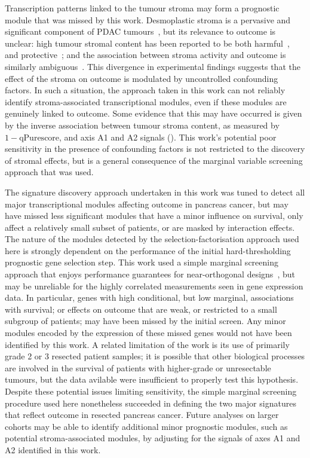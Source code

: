 \documentclass[dissertation.tex]{subfiles}
\begin{document}
Transcription patterns linked to the tumour stroma may form a prognostic module that was missed by this work.  Desmoplastic stroma is a pervasive and significant component of \gls{PDAC} tumours~\cite{Hidalgo2010}, but its relevance to outcome is unclear: high tumour stromal content has been reported to be both harmful~\cite{Luo2012, Provenzano2012}, and protective~\cite{Rhim2014, Sinn2014}; and the association between stroma activity and outcome is similarly ambiguous~\cite{Bever2014, Sinn2014}.  This divergence in experimental findings suggests that the effect of the stroma on outcome is modulated by uncontrolled confounding factors.  In such a situation, the approach taken in this work can not reliably identify stroma-associated transcriptional modules, even if these modules are genuinely linked to outcome.  Some evidence that this may have occurred is given by the inverse association between tumour stroma content, as measured by $1 - \mathrm{qPure score}$, and axis A1 and A2 signals ().  This work's potential poor sensitivity in the presence of confounding factors is not restricted to the discovery of stromal effects, but is a general consequence of the marginal variable screening approach that was used.

The signature discovery approach undertaken in this work was tuned to detect all major transcriptional modules affecting outcome in pancreas cancer, but may have missed less significant modules that have a minor influence on survival, only affect a relatively small subset of patients, or are masked by interaction effects.  The nature of the modules detected by the selection-factorisation approach used here is strongly dependent on the performance of the initial hard-thresholding prognostic gene selection step.  This work used a simple marginal screening approach that enjoys performance guarantees for near-orthogonal designs~\cite{Fan2008}, but may be unreliable for the highly correlated measurements seen in gene expression data.  In particular, genes with high conditional, but low marginal, associations with survival; or effects on outcome that are weak, or restricted to a small subgroup of patients; may have been missed by the initial screen.  Any minor modules encoded by the expression of these missed genes would not have been identified by this work.  A related limitation of the work is its use of primarily grade 2 or 3 resected patient samples; it is possible that other biological processes are involved in the survival of patients with higher-grade or unresectable tumours, but the data avilable were insufficient to properly test this hypothesis.  Despite these potential issues limiting sensitivity, the simple marginal screening procedure used here nonetheless succeeded in defining the two major signatures that reflect outcome in resected pancreas cancer.  Future analyses on larger cohorts may be able to identify additional minor prognostic modules, such as potential stroma-associated modules, by adjusting for the signals of axes A1 and A2 identified in this work.
\end{document}
